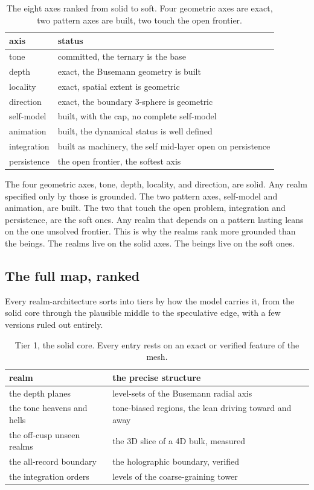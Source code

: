 \begin{table}[ht]
\centering
\begin{tabular}{@{}ll@{}}
\toprule
axis & status \\
\midrule
tone & committed, the ternary is the base \\
depth & exact, the Busemann geometry is built \\
locality & exact, spatial extent is geometric \\
direction & exact, the boundary 3-sphere is geometric \\
self-model & built, with the cap, no complete self-model \\
animation & built, the dynamical status is well defined \\
integration & built as machinery, the self mid-layer open on persistence \\
persistence & the open frontier, the softest axis \\
\bottomrule
\end{tabular}
\caption{The eight axes ranked from solid to soft. Four geometric axes are
exact, two pattern axes are built, two touch the open frontier.}
\label{tab:axis-ranking}
\end{table}

The four geometric axes, tone, depth, locality, and direction, are solid.
Any realm specified only by those is grounded. The two pattern axes,
self-model and animation, are built. The two that touch the open problem,
integration and persistence, are the soft ones. Any realm that depends on a
pattern lasting leans on the one unsolved frontier. This is why the realms
rank more grounded than the beings. The realms live on the solid axes. The
beings live on the soft ones.

\subsection{The full map, ranked}

Every realm-architecture sorts into tiers by how the model carries it, from
the solid core through the plausible middle to the speculative edge, with a
few versions ruled out entirely.

\begin{table}[ht]
\centering
\begin{tabular}{@{}ll@{}}
\toprule
realm & the precise structure \\
\midrule
the depth planes & level-sets of the Busemann radial axis \\
the tone heavens and hells & tone-biased regions, the lean driving toward and away \\
the off-cusp unseen realms & the 3D slice of a 4D bulk, measured \\
the all-record boundary & the holographic boundary, verified \\
the integration orders & levels of the coarse-graining tower \\
\bottomrule
\end{tabular}
\caption{Tier 1, the solid core. Every entry rests on an exact or verified
feature of the mesh.}
\label{tab:tier-one}
\end{table}

